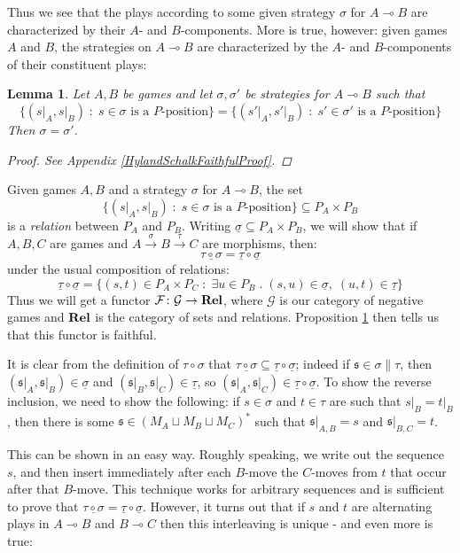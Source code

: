\documentclass[11pt]{article} %
\theoremstyle{plain} %
\newtheorem{lemma}[theorem]{Lemma}
\theoremstyle{definition} %
\theoremstyle{note}
\theoremstyle{exercisestyle}
\newcommand{\catname}[1]{{\normalfont\textbf{#1}}}
\newcommand{\Rel}{\catname{Rel}}
\newcommand{\map}[3]{#2\xrightarrow{#1} #3}
\newcommand*\from{\colon}
\newcommand{\cmap}[3]{#1\from{}#2\to{}#3}
\renewcommand{\implies}{\multimap}
\newcommand{\comp}[2]{#1 \circ #2}
\newcommand{\cprd}{\sqcup}
\newcommand{\G}{\mathcal G}
\newcommand{\suchthat}{\;\colon\;}
\newcommand{\esuchthat}{\;.\;}
\newcommand{\F}{\mathcal F}
\newcommand{\s}{\mathfrak s}
\newcommand{\grel}[1]{\underline{#1}}
\renewcommand{\subset}{\subseteq}
\begin{document}
Thus we see that the plays according to some given strategy $\sigma$ for $A\implies B$ are characterized by their $A$- and $B$-components.  More is true, however: given games $A$ and $B$, the strategies on $A\implies B$ are characterized by the $A$- and $B$-components of their constituent plays:
\begin{lemma}
  \label{HylandSchalkFaithful}
  Let $A,B$ be games and let $\sigma,\sigma'$ be strategies for $A\implies B$ such that
  \[
    \{(s\vert_A,s\vert_B)\suchthat \textrm{$s\in\sigma$ is a $P$-position}\}=\{(s'\vert_A,s'\vert_B)\suchthat\textrm{$s'\in\sigma'$ is a $P$-position}\}
    \]
  Then $\sigma=\sigma'$.
  \begin{proof}
    See Appendix \ref{HylandSchalkFaithfulProof}.
  \end{proof}
\end{lemma}

Given games $A,B$ and a strategy $\sigma$ for $A\implies B$, the set
\[
  \{(s\vert_A,s\vert_B)\suchthat \textrm{$s\in\sigma$ is a $P$-position}\}\subset P_A\times P_B
  \]
is a \emph{relation} between $P_A$ and $P_B$.  Writing $\grel\sigma\subset P_A\times P_B$, we will show that if $A,B,C$ are games and $A\xrightarrow{\sigma}\map{\tau}{B}{C}$ are morphisms, then:
\[
  \grel{\comp\tau\sigma}=\comp{\grel\tau}{\grel\sigma}
  \]
under the usual composition of relations:
\[
  \comp{\grel\tau}{\grel\sigma} = \{(s,t)\in P_A\times P_C\suchthat \exists u\in P_B\esuchthat (s,u)\in\grel\sigma,\;(u,t)\in\grel\tau\}
  \]
Thus we will get a functor $\cmap{\F}{\G}{\Rel}$, where $\G$ is our category of negative games and $\Rel$ is the category of sets and relations.  Proposition \ref{HylandSchalkFaithful} then tells us that this functor is faithful.  

It is clear from the definition of $\comp\tau\sigma$ that $\grel{\comp\tau\sigma}\subset\comp{\grel\tau}{\grel\sigma}$; indeed if $\s\in\sigma\|\tau$, then $(\s\vert_A,\s\vert_B)\in\grel\sigma$ and $(\s\vert_B,\s\vert_C)\in\grel\tau$, so $(\s\vert_A,\s\vert_C)\in\comp{\grel\tau}{\grel\sigma}$.  To show the reverse inclusion, we need to show the following: if $s\in\sigma$ and $t\in\tau$ are such that $s\vert_B=t\vert_B$, then there is some $\s\in (M_A\cprd M_B\cprd M_C)^*$ such that $\s\vert_{A,B}=s$ and $\s\vert_{B,C}=t$.  

This can be shown in an easy way.  Roughly speaking, we write out the sequence $s$, and then insert immediately after each $B$-move the $C$-moves from $t$ that occur after that $B$-move.  This technique works for arbitrary sequences and is sufficient to prove that $\grel{\comp\tau\sigma}=\comp{\grel\tau}{\grel\sigma}$.  However, it turns out that if $s$ and $t$ are alternating plays in $A\implies B$ and $B\implies C$ then this interleaving is unique - and even more is true:
\end{document}
